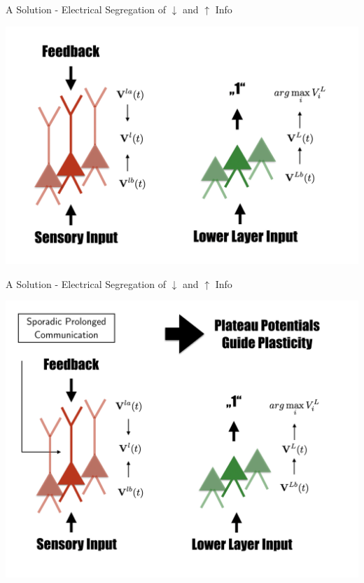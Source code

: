 \documentclass[dvipsnames, usenames]{beamer}
\begin{document}
\begin{frame}[noframenumbering]{A Solution - Electrical Segregation of $\downarrow$ and $\uparrow$ Info}

\centering 
\includegraphics[width=1.1\textwidth]{../figures/report/elec_seg_2}
\end{frame}
\begin{frame}[noframenumbering]{A Solution - Electrical Segregation of $\downarrow$ and $\uparrow$ Info}

\centering 
\includegraphics[width=1.05\textwidth]{../figures/report/elec_seg_3}
\end{frame}
\end{document}
